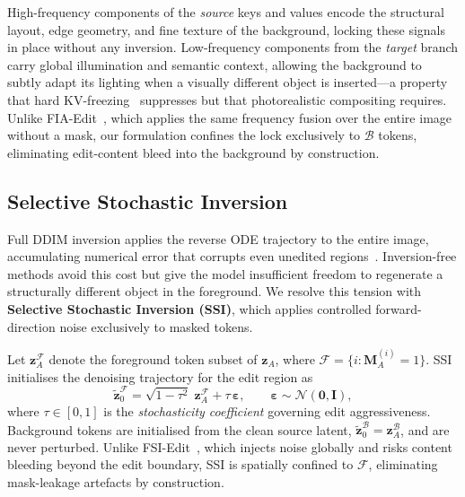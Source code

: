 High-frequency components of the \emph{source} keys and values encode the structural layout,
edge geometry, and fine texture of the background, locking these signals in place without any
inversion.
Low-frequency components from the \emph{target} branch carry global illumination and semantic
context, allowing the background to subtly adapt its lighting when a visually different object
is inserted---a property that hard KV-freezing~\cite{zhu2025kvedit} suppresses but that
photorealistic compositing requires.
Unlike FIA-Edit~\cite{yang2026fia}, which applies the same frequency fusion over the entire
image without a mask, our formulation confines the lock exclusively to $\mathcal{B}$ tokens,
eliminating edit-content bleed into the background by construction.

\subsection{Selective Stochastic Inversion}

Full DDIM inversion applies the reverse ODE trajectory to the entire image, accumulating
numerical error that corrupts even unedited regions~\cite{wallace2023edict}.
Inversion-free methods avoid this cost but give the model insufficient freedom to regenerate
a structurally different object in the foreground.
We resolve this tension with \textbf{Selective Stochastic Inversion (SSI)}, which applies
controlled forward-direction noise exclusively to masked tokens.

Let $\mathbf{z}_A^{\mathcal{F}}$ denote the foreground token subset of $\mathbf{z}_A$,
where $\mathcal{F} = \{i : \mathbf{M}_A^{(i)} = 1\}$.
SSI initialises the denoising trajectory for the edit region as
\begin{equation}
    \tilde{\mathbf{z}}_0^{\mathcal{F}}
        = \sqrt{1-\tau^2}\;\mathbf{z}_A^{\mathcal{F}} + \tau\,\boldsymbol{\varepsilon},
    \qquad \boldsymbol{\varepsilon} \sim \mathcal{N}(\mathbf{0}, \mathbf{I}),
    \label{eq:ssi}
\end{equation}
where $\tau \in [0, 1]$ is the \emph{stochasticity coefficient} governing edit aggressiveness.
Background tokens are initialised from the clean source latent,
$\tilde{\mathbf{z}}_0^{\mathcal{B}} = \mathbf{z}_A^{\mathcal{B}}$, and are never perturbed.
Unlike FSI-Edit~\cite{yang2026fsi}, which injects noise globally and risks content bleeding
beyond the edit boundary, SSI is spatially confined to $\mathcal{F}$, eliminating
mask-leakage artefacts by construction.

